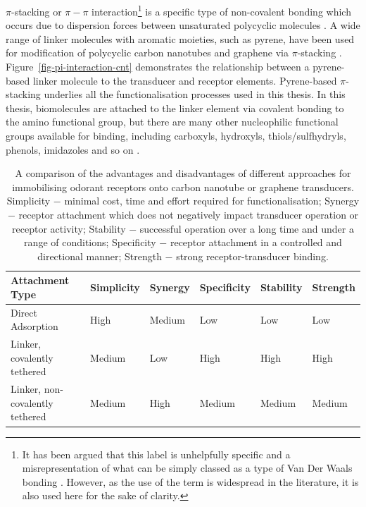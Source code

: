 \documentclass[
  a4paper,
]{scrbook}
\begin{document}
\(\pi\)-stacking or \(\pi-\pi\) interaction\footnote{It has been argued
  that this label is unhelpfully specific and a misrepresentation of
  what can be simply classed as a type of Van Der Waals bonding
  \autocite{Martinez2012,Perez2015}. However, as the use of the term is
  widespread in the literature, it is also used here for the sake of
  clarity.} is a specific type of non-covalent bonding which occurs due
to dispersion forces between unsaturated polycyclic molecules
\autocite{Perez2015}. A wide range of linker molecules with aromatic
moieties, such as pyrene, have been used for modification of polycyclic
carbon nanotubes and graphene via \(\pi\)-stacking
\autocite{Hermanson2013-16,Perez2015,Zhou2019,Mishyn2022}.
Figure~\ref{fig-pi-interaction-cnt} demonstrates the relationship
between a pyrene-based linker molecule to the transducer and receptor
elements. Pyrene-based \(\pi\)-stacking underlies all the
functionalisation processes used in this thesis. In this thesis,
biomolecules are attached to the linker element via covalent bonding to
the amino functional group, but there are many other nucleophilic
functional groups available for binding, including carboxyls, hydroxyls,
thiols/sulfhydryls, phenols, imidazoles and so on
\autocite{Fruh2011,Dung2018}.

\hypertarget{tbl-functionalisation-types}{}
\begin{longtable}[t]{>{\raggedright\arraybackslash}p{5.4cm}>{\raggedright\arraybackslash}p{1.45cm}>{\raggedright\arraybackslash}p{1.3cm}>{\raggedright\arraybackslash}p{1.45cm}>{\raggedright\arraybackslash}p{1.3cm}>{\raggedright\arraybackslash}p{1.3cm}}
\caption{\label{tbl-functionalisation-types}A comparison of the advantages and disadvantages of different approaches
for immobilising odorant receptors onto carbon nanotube or graphene
transducers. Simplicity \(-\) minimal cost, time and effort required for
functionalisation; Synergy \(-\) receptor attachment which does not
negatively impact transducer operation or receptor activity; Stability
\(-\) successful operation over a long time and under a range of
conditions; Specificity \(-\) receptor attachment in a controlled and
directional manner; Strength \(-\) strong receptor-transducer binding. }\tabularnewline

\toprule
Attachment Type & Simplicity & Synergy & Specificity & Stability & Strength\\
\midrule
Direct Adsorption & High & Medium & Low & Low & Low\\
Linker, covalently tethered & Medium & Low & High & High & High\\
Linker, non-covalently tethered & Medium & High & Medium & Medium & Medium\\
\bottomrule
\end{longtable}
\end{document}
